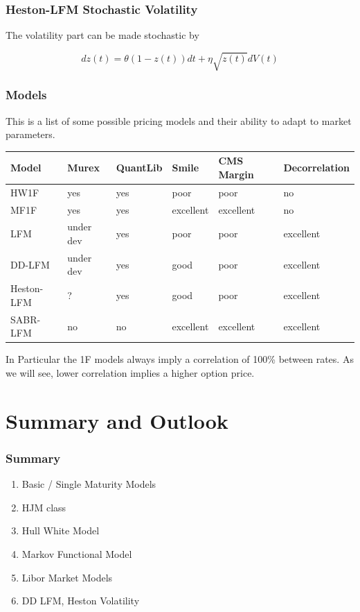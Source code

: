 \documentclass{beamer}
\begin{document}
\begin{frame}
\frametitle{Heston-LFM Stochastic Volatility}
The volatility part can be made stochastic by

\begin{equation}
dz(t) = \theta ( 1 - z(t) ) dt + \eta \sqrt{z(t)} dV(t)
\end{equation}

\end{frame}

\begin{frame}
\frametitle{Models}
This is a list of some possible pricing models and their ability to adapt to market parameters.
\begin{table}[ht]
\small
\begin{tabular}{l | l | l | l | l | l}
Model&Murex&QuantLib&Smile&CMS Margin&Decorrelation\\ \hline
HW1F&yes&yes&poor&poor&no \\
MF1F&yes&yes&excellent&excellent&no \\
LFM&under dev&yes&poor&poor&excellent \\
DD-LFM&under dev&yes&good&poor&excellent \\
Heston-LFM&?&yes&good&poor&excellent \\
SABR-LFM&no&no&excellent&excellent&excellent
\end{tabular}
\end{table}

In Particular the 1F models always imply a correlation of 100\% between rates. As we will see, lower
correlation implies a higher option price.
\end{frame}


\section{Summary and Outlook}


\begin{frame}
\frametitle{Summary}
\begin{enumerate}
\item Basic / Single Maturity Models
\item HJM class
\item Hull White Model
\item Markov Functional Model
\item Libor Market Models
\item DD LFM, Heston Volatility
\end{enumerate}
\end{frame}
\end{document}
